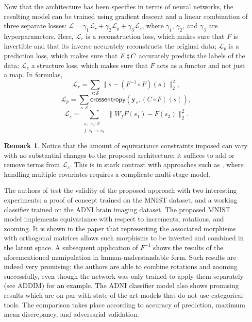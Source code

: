 \documentclass[11pt,a4paper,openright,twoside]{report}
\newcounter{mycounter}
\theoremstyle{plain}
\theoremstyle{definition}
\newtheorem{remark}[mycounter]{Remark}
\begin{document}
Now that the architecture has been specifies in terms of neural networks, the resulting model can be trained using gradient descent and a linear combination of three separate losses: $\mathcal{L} = \gamma_1\mathcal{L}_r + \gamma_2\mathcal{L}_p + \gamma_3\mathcal{L}_s$, where $\gamma_1$, $\gamma_2$, and $\gamma_3$ are hyperparameters. Here, $\mathcal{L}_r$ is a reconstruction loss, which makes sure that $F$ is invertible and that its inverse accurately reconstructs the original data; $\mathcal{L}_p$ is a prediction loss, which makes sure that $F \fatsemi C$ accurately predicts the labels of the data; $\mathcal{L}_s$ a structure loss, which makes sure that $F$ acts as a functor and not just a map. In formulas,
\[\mathcal{L}_r = \sum_{s : \mathcal{S}}\|s-(F^{-1} \circ F)(s)\|^2_2,\]
\[\mathcal{L}_p = \sum_{s : \mathcal{S}}\mathsf{crossentropy}(\mathbf{y}_s,(C \circ F)(s)),\]
\[\mathcal{L}_s = \sum_{\begin{smallmatrix}s_1, s_2 : \mathcal{S} \\ f: s_1 \to s_2 \end{smallmatrix}}\|W_fF(s_1)-F(s_2)\|^2_2.\]

\begin{remark}
  Notice that the amount of equivariance constraints imposed can vary with no substantial changes to the proposed architecture: it suffices to add or remove terms from $\mathcal{L}_s$. This is in stark contrast with approaches such as \cite{lokhande2022equivariance}, where handling multiple covariates requires a complicate multi-stage model. 
\end{remark}

The authors of \cite{chytas2024poolingimagedatasetsmultiple} test the validity of the proposed approach with two interesting experiments: a proof of concept trained on the MNIST dataset, and a working classifier trained on the ADNI brain imaging dataset. The proposed MNIST model implements equivariance with respect to increments, rotations, and zooming. It is shown in the paper that representing the associated morphisms with orthogonal matrices allows such morphisms to be inverted and combined in the latent space. A subsequent application of $F^{-1}$ shows the results of the aforementioned manipulation in human-understandable form. Such results are indeed very promising: the authors are able to combine rotations and zooming successfully, even though the network was only trained to apply them separately (see ADDIM) for an example. The ADNI classifier model also shows promising results which are on par with state-of-the-art models that do not use categorical tools. The comparison takes place according to accuracy of prediction, maximum mean discrepancy, and adversarial validation.
\end{document}
